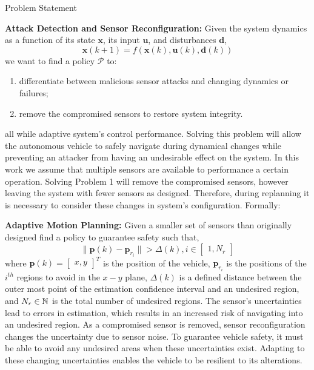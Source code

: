 \begin{section}{Problem Statement}
\begin{problem} 
\label{problem1} {\textbf{Attack Detection and Sensor Reconfiguration:}} 
 Given the system dynamics as a function of its state $ \bm{x} $, its input $ \bm{u}$, and disturbances $ \bm{d} $,
	\begin{equation}
		\bm{x}(k+1) = f(\bm{x}(k), \bm{u}(k), \bm{d}(k))
	\end{equation}
we want to find a policy $\mathcal{P}$ to:
\begin{enumerate}
	\item differentiate between malicious sensor attacks and changing dynamics or failures; 
	\item remove the compromised sensors to restore system integrity. %
\end{enumerate}
all while adaptive system's control performance. Solving this problem will allow the autonomous vehicle to safely navigate during dynamical changes while preventing an attacker from having an undesirable effect on the system. In this work we assume that multiple sensors are available to performance a certain operation. Solving Problem 1 will remove the compromised sensors, however leaving the system with fewer sensors as designed. 
Therefore, during replanning it is necessary to consider these changes in system's configuration. Formally:
\end{problem}
	
\begin{problem} \label{problem2} {\textbf{Adaptive Motion Planning:}} 
Given a smaller set of sensors than originally designed find a policy to guarantee safety such that,
	\begin{equation}
		\lVert {\bm{p}(k)-\bm{p}_{r_i}} \rVert >\Delta(k),  i \in \begin{bmatrix} 1,N_r \end{bmatrix}
	\end{equation}
where $\bm{p}(k)={\begin{bmatrix} x,y \end{bmatrix}}^T$ is the position of the vehicle, $\bm{p}_{r_i}$ is the positions of the ${i}^{th}$ regions to avoid in the $x-y$ plane, $\Delta(k)$ is a defined distance between the outer most point of the estimation confidence interval and an undesired region, and $N_r \in \mathbb{N}$ is the total number of undesired regions. The sensor's uncertainties lead to errors in estimation, which results in an increased risk of navigating into an undesired region. As a compromised sensor is removed, sensor reconfiguration changes the uncertainty due to sensor noise. To guarantee vehicle safety, it must be able to avoid any undesired areas when these uncertainties exist. Adapting to these changing uncertainties enables the vehicle to be resilient to its alterations.


\end{problem}
\end{section}
